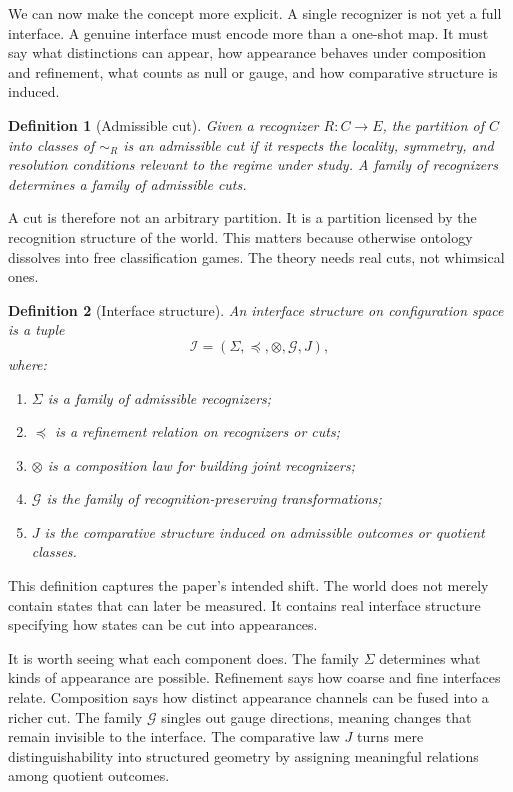 \documentclass[11pt]{article}
\newtheorem{definition}{Definition}
\begin{document}
We can now make the concept more explicit.
A single recognizer is not yet a full interface.
A genuine interface must encode more than a one-shot map.
It must say what distinctions can appear, how appearance behaves under composition and refinement, what counts as null or gauge, and how comparative structure is induced.

\begin{definition}[Admissible cut]
Given a recognizer $R : C \to E$, the partition of $C$ into classes of $\sim_R$ is an admissible cut if it respects the locality, symmetry, and resolution conditions relevant to the regime under study.
A family of recognizers determines a family of admissible cuts.
\end{definition}

A cut is therefore not an arbitrary partition.
It is a partition licensed by the recognition structure of the world.
This matters because otherwise ontology dissolves into free classification games.
The theory needs real cuts, not whimsical ones.

\begin{definition}[Interface structure]
An interface structure on configuration space is a tuple
\[
\mathcal{I} = (\Sigma,\preceq,\otimes,\mathcal{G},J),
\]
where:
\begin{enumerate}
    \item $\Sigma$ is a family of admissible recognizers;
    \item $\preceq$ is a refinement relation on recognizers or cuts;
    \item $\otimes$ is a composition law for building joint recognizers;
    \item $\mathcal{G}$ is the family of recognition-preserving transformations;
    \item $J$ is the comparative structure induced on admissible outcomes or quotient classes.
\end{enumerate}
\end{definition}

This definition captures the paper's intended shift.
The world does not merely contain states that can later be measured.
It contains real interface structure specifying how states can be cut into appearances.

It is worth seeing what each component does.
The family $\Sigma$ determines what kinds of appearance are possible.
Refinement says how coarse and fine interfaces relate.
Composition says how distinct appearance channels can be fused into a richer cut.
The family $\mathcal{G}$ singles out gauge directions, meaning changes that remain invisible to the interface.
The comparative law $J$ turns mere distinguishability into structured geometry by assigning meaningful relations among quotient outcomes.
\end{document}
